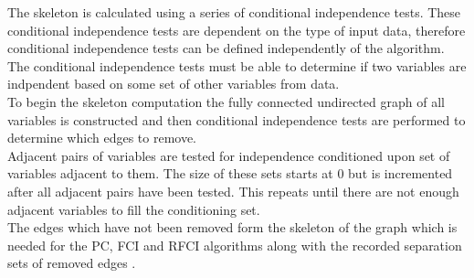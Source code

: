 \documentclass{article}
\begin{document}
The skeleton is calculated using a series of conditional independence tests. These conditional independence tests are dependent on the type of input data, therefore conditional independence tests can be defined independently of the algorithm. The conditional independence tests must be able to determine if two variables are indpendent based on some set of other variables from data.
\\

To begin the skeleton computation the fully connected undirected graph of all variables is constructed and then conditional independence tests are performed to determine which edges to remove.
\\

Adjacent pairs of variables are tested for independence conditioned upon set of variables adjacent to them. The size of these sets starts at 0 but is incremented after all adjacent pairs have been tested. This repeats until there are not enough adjacent variables to fill the conditioning set.\\

 The edges which have not been removed form the skeleton of the graph which is needed for the PC, FCI and RFCI algorithms along with the recorded separation sets of removed edges \cite{colombo2012learning, spirtes1991algorithm}.
\\
\end{document}
